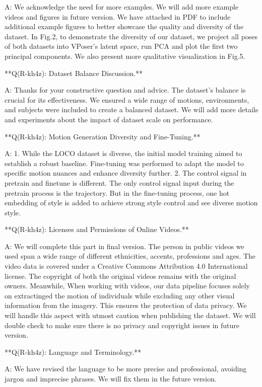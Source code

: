 \documentclass{article}
\begin{document}
\begin{markdown}
A: We acknowledge the need for more examples. We will add more example videos and figures in future version. We have attached in PDF to include additional example figures to better showcase the quality and diversity of the dataset. In Fig.2, to demonstrate the diversity of our dataset, we project all poses of both datasets into VPoser’s latent space, run PCA and plot the first two principal components. We also present more qualitative visualization in Fig.5.

**Q(R-kh4z): Dataset Balance Discussion.**

A: Thanks for your constructive question and advice. The dataset's balance is crucial for its effectiveness. We ensured a wide range of motions, environments, and subjects were included to create a balanced dataset. We will add more details and experiments about the impact of dataset scale on performance. 

**Q(R-kh4z): Motion Generation Diversity and Fine-Tuning.**

A: 1. While the LOCO dataset is diverse, the initial model training aimed to establish a robust baseline. Fine-tuning was performed to adapt the model to specific motion nuances and enhance diversity further. 2. The control signal in pretrain and finetune is different. The only control signal input during the pretrain process is the trajectory. But in the fine-tuning process, one hot embedding of style is added to achieve strong style control and see diverse motion style.

**Q(R-kh4z): Licenses and Permissions of Online Videos.**

A: We will complete this part in final version. The person in public videos we used span a wide range of different ethnicities, accents, professions and ages. The video data is covered under a Creative Commons Attribution 4.0 International license. The copyright of both the original videos remains with the original owners. Meanwhile, When working with videos, our data pipeline focuses solely on extractinged the motion of individuals while excluding any other visual information from the imagery. 
This ensures the protection of data privacy. We will handle this aspect with utmost caution when publishing the dataset.
We will double check to make sure there is no privacy and copyright issues in future version.

**Q(R-kh4z): Language and Terminology.**

A: We have revised the language to be more precise and professional, avoiding jargon and imprecise phrases. We will fix them in the future version.


\end{markdown}
\end{document}

